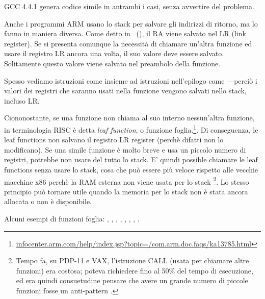 GCC 4.4.1 genera codice simile in antrambi i casi, senza avvertire del problema.


Anche i programmi ARM usano lo stack per salvare gli indirizzi di ritorno, ma lo fanno in maniera diversa.
Come detto in \q{\HelloWorldSectionName}~(),
il \ac{RA} viene salvato nel \ac{LR} (\gls{link register}).
Se si presenta comunque la necessità di chiamare un'altra funzione ed usare il registro \ac{LR} ancora una volta,
il suo valore deve essere salvato.
Solitamente questo valore viene salvato nel preambolo della funzione.

Spesso vediamo istruzioni come  insieme ad istruzioni nell'epilogo come
---perciò i valori dei registri che saranno usati nella funzione vengono salvati nello stack, incluso \ac{LR}.

Ciononostante, se una funzione non chiama al suo interno nessun'altra funzione, in terminologia \ac{RISC} è detta
\emph{\gls{leaf function}}, o funzione foglia.\footnote{\href{http://go.yurichev.com/17064}{infocenter.arm.com/help/index.jsp?topic=/com.arm.doc.faqs/ka13785.html}}.
Di conseguenza, le leaf functions non salvano il registro \ac{LR} register (perchè difatti non lo modificano).
Se una simile funzione è molto breve e usa un piccolo numero di registri, potrebbe non usare del tutto lo stack.
E' quindi possible chiamare le leaf functions senza usare lo stack, cosa che può essere più veloce rispetto alle vecchie macchine x86 perchè la RAM esterna non viene usata per lo stack
\footnote{Tempo fa, su PDP-11 e VAX, l'istruzione CALL (usata per chiamare altre funzioni) era costosa; poteva richiedere fino al 50\%
del tempo di esecuzione, ed era quindi consuetudine pensare che avere un grande numero di piccole funzioni fosse un \gls{anti-pattern} .}.
Lo stesso principio può tornare utile quando la memoria per lo stack non è stata ancora allocata o non è disponibile.

Alcuni esempi di funzioni foglia:
, ,
, , ,
, , .
